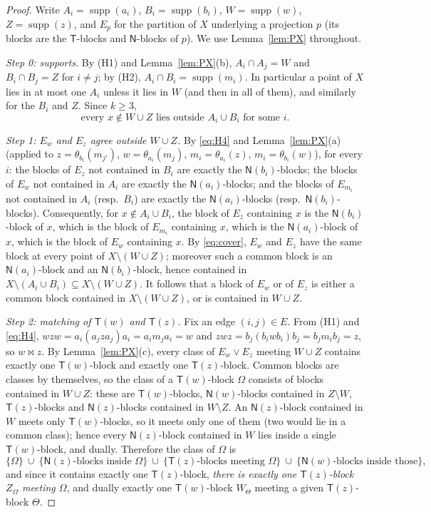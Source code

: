 \documentclass[11pt]{amsart}
\theoremstyle{definition}
\newcommand{\supp}{\operatorname{supp}}
\newcommand{\T}{\mathsf{T}}
\newcommand{\N}{\mathsf{N}}
\newcommand{\mt}{\bowtie}   %
\begin{document}
\begin{proof}
Write $A_i=\supp(a_i)$, $B_i=\supp(b_i)$, $W=\supp(w)$, $Z=\supp(z)$, and $E_p$ for the partition of $X$ underlying a projection $p$ (its blocks are the $\T$-blocks and $\N$-blocks of $p$). We use Lemma~\ref{lem:PX} throughout.

\emph{Step 0: supports.} By (H1) and Lemma~\ref{lem:PX}(b), $A_i\cap A_j=W$ and $B_i\cap B_j=Z$ for $i\ne j$; by (H2), $A_i\cap B_i=\supp(m_i)$. In particular a point of $X$ lies in at most one $A_i$ unless it lies in $W$ (and then in all of them), and similarly for the $B_i$ and $Z$. Since $k\ge3$,
\begin{equation}\label{eq:cover}
\text{every } x\notin W\cup Z \text{ lies outside } A_i\cup B_i \text{ for some } i .
\end{equation}

\emph{Step 1: $E_w$ and $E_z$ agree outside $W\cup Z$.} By \eqref{eq:H4} and Lemma~\ref{lem:PX}(a) (applied to $z=\theta_{b_i}(m_{j'})$, $w=\theta_{a_i}(m_j)$, $m_i=\theta_{a_i}(z)$, $m_i=\theta_{b_i}(w)$), for every $i$: the blocks of $E_z$ not contained in $B_i$ are exactly the $\N(b_i)$-blocks; the blocks of $E_w$ not contained in $A_i$ are exactly the $\N(a_i)$-blocks; and the blocks of $E_{m_i}$ not contained in $A_i$ (resp.\ $B_i$) are exactly the $\N(a_i)$-blocks (resp.\ $\N(b_i)$-blocks). Consequently, for $x\notin A_i\cup B_i$, the block of $E_z$ containing $x$ is the $\N(b_i)$-block of $x$, which is the block of $E_{m_i}$ containing $x$, which is the $\N(a_i)$-block of $x$, which is the block of $E_w$ containing $x$. By \eqref{eq:cover}, $E_w$ and $E_z$ have the same block at every point of $X\setminus(W\cup Z)$; moreover such a common block is an $\N(a_i)$-block and an $\N(b_i)$-block, hence contained in $X\setminus(A_i\cup B_i)\subseteq X\setminus(W\cup Z)$. It follows that a block of $E_w$ or of $E_z$ is either a common block contained in $X\setminus(W\cup Z)$, or is contained in $W\cup Z$.

\emph{Step 2: matching of $\T(w)$ and $\T(z)$.} Fix an edge $(i,j)\in E$. From (H1) and \eqref{eq:H4}, $wzw=a_i(a_jza_j)a_i=a_im_ja_i=w$ and $zwz=b_j(b_iwb_i)b_j=b_jm_ib_j=z$, so $w\mt z$. By Lemma~\ref{lem:PX}(c), every class of $E_w\vee E_z$ meeting $W\cup Z$ contains exactly one $\T(w)$-block and exactly one $\T(z)$-block. Common blocks are classes by themselves, so the class of a $\T(w)$-block $\Omega$ consists of blocks contained in $W\cup Z$: these are $\T(w)$-blocks, $\N(w)$-blocks contained in $Z\setminus W$, $\T(z)$-blocks and $\N(z)$-blocks contained in $W\setminus Z$. An $\N(z)$-block contained in $W$ meets only $\T(w)$-blocks, so it meets only one of them (two would lie in a common class); hence every $\N(z)$-block contained in $W$ lies inside a single $\T(w)$-block, and dually. Therefore the class of $\Omega$ is
\[
\{\Omega\}\ \cup\ \{\N(z)\text{-blocks inside }\Omega\}\ \cup\ \{\T(z)\text{-blocks meeting }\Omega\}\ \cup\ \{\N(w)\text{-blocks inside those}\},
\]
and since it contains exactly one $\T(z)$-block, \emph{there is exactly one $\T(z)$-block $Z_\Omega$ meeting $\Omega$}, and dually exactly one $\T(w)$-block $W_\Theta$ meeting a given $\T(z)$-block $\Theta$.


\end{proof}
\end{document}
